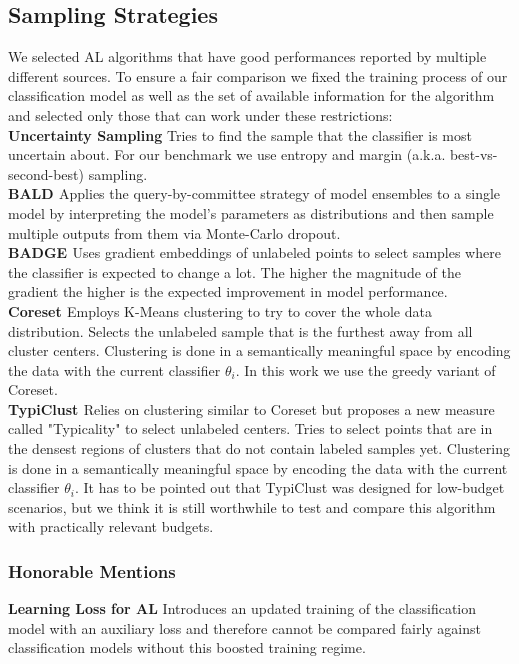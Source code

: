 \documentclass[]{article}
\begin{document}
\subsection{Sampling Strategies}\label{sec:sampling_strategies}
We selected AL algorithms that have good performances reported by multiple different sources.
To ensure a fair comparison we fixed the training process of our classification model as well as the set of available information for the algorithm and selected only those that can work under these restrictions:\\
\textbf{Uncertainty Sampling} 
Tries to find the sample that the classifier is most uncertain about. For our benchmark we use entropy and margin (a.k.a. best-vs-second-best) sampling.\\
\textbf{BALD \cite{kirsch2019batchbald}}
Applies the query-by-committee strategy of model ensembles to a single model by interpreting the model's parameters as distributions and then sample multiple outputs from them via Monte-Carlo dropout.\\
\textbf{BADGE \cite{ashdeep}} Uses gradient embeddings of unlabeled points to select samples where the classifier is expected to change a lot. The higher the magnitude of the gradient the higher is the expected improvement in model performance.\\
\textbf{Coreset \cite{sener2017active}}
Employs K-Means clustering to try to cover the whole data distribution.
Selects the unlabeled sample that is the furthest away from all cluster centers.
Clustering is done in a semantically meaningful space by encoding the data with the current classifier $\theta_i$.
In this work we use the greedy variant of Coreset.\\
\textbf{TypiClust \cite{hacohen2022active}}
Relies on clustering similar to Coreset but proposes a new measure called "Typicality" to select unlabeled centers.
Tries to select points that are in the densest regions of clusters that do not contain labeled samples yet.
Clustering is done in a semantically meaningful space by encoding the data with the current classifier $\theta_i$.
It has to be pointed out that TypiClust was designed for low-budget scenarios, but we think it is still worthwhile to test and compare this algorithm with practically relevant budgets.
%
\subsubsection{Honorable Mentions}
\textbf{Learning Loss for AL}
Introduces an updated training of the classification model with an auxiliary loss and therefore cannot be compared fairly against classification models without this boosted training regime.
\end{document}
